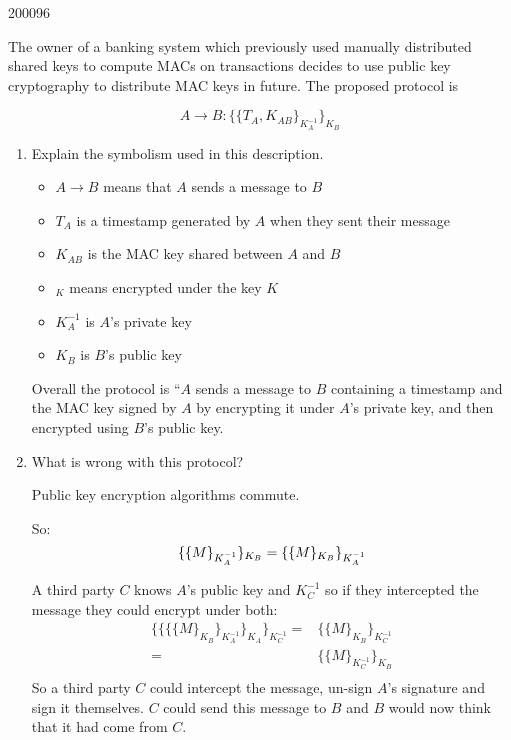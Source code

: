 \documentclass[10pt,\jkfside,a4paper]{article}
\begin{document}
\begin{enumerate}
\begin{examquestion}{2000}{9}{6}

The owner of a banking system which previously used manually distributed shared
keys to compute MACs on transactions decides to use public key cryptography to
distribute MAC keys in future. The proposed protocol is

\[
A \rightarrow B: \{\{T_A, K_{AB}\}_{K_A^{-1}}\}_{K_B}
\]

\begin{enumerate}[label=(\alph*)]

\item Explain the symbolism used in this description.

\begin{itemize}

\item $A \rightarrow B$ means that $A$ sends a message to $B$

\item $T_A$ is a timestamp generated by $A$ when they sent their message

\item $K_{AB}$ is the MAC key shared between $A$ and $B$

\item ${}_K$ means encrypted under the key $K$

\item $K_A^{-1}$ is $A$'s private key

\item $K_B$ is $B$'s public key

\end{itemize}

Overall the protocol is ``$A$ sends a message to $B$ containing a timestamp
and the MAC key signed by $A$ by encrypting it under $A$'s private key, and
then encrypted using $B$'s public key.

\item What is wrong with this protocol?

Public key encryption algorithms commute.

So:
\[
\{\{M\}_{K_A^{-1}}\}_{K_B} = \{\{M\}_{K_B}\}_{K_A^{-1}} \\
\]

A third party $C$ knows $A$'s public key and $K_C^{-1}$ so if they
intercepted the message they could encrypt under both:
\[
\begin{split}
\{\{\{\{M\}_{K_B}\}_{K_A^{-1}}\}_{K_A}\}_{K^{-1}_C}
=& \{\{M\}_{K_B}\}_{K^{-1}_C} \\
=& \{\{M\}_{K^{-1}_C}\}_{K_B} \\
\end{split}
\]
So a third party $C$ could intercept the message, un-sign $A$'s signature
and sign it themselves. $C$ could send this message to $B$ and $B$ would
now think that it had come from $C$.


\end{enumerate}
\end{examquestion}
\end{enumerate}
\end{document}
